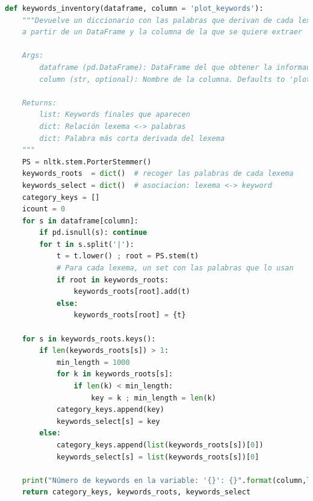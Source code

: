 \begin{lstlisting}[language=Python, caption= Obtención del lexema de cada keywords y creación del diccionario de equivalencia.]
def keywords_inventory(dataframe, column = 'plot_keywords'):
    """Devuelve un diccionario con las palabras que derivan de cada lexema
    a partir de un DataFrame y la columna de la que se quiere extraer
    
    Args:
        dataframe (pd.DataFrame): DataFrame del que obtener la información.
        column (str, optional): Nombre de la columna. Defaults to 'plot_keywords'.
    
    Returns:
        list: Keywords finales que aparecen
        dict: Relación lexema <-> palabras
        dict: Palabra más corta derivada del lexema
    """
    PS = nltk.stem.PorterStemmer()
    keywords_roots  = dict()  # recoger las palabras de cada lexema
    keywords_select = dict()  # asociacion: lexema <-> keyword
    category_keys = []
    icount = 0
    for s in dataframe[column]:
        if pd.isnull(s): continue
        for t in s.split('|'):
            t = t.lower() ; root = PS.stem(t)
            # Para cada lexema, un set con las palabras que lo usan
            if root in keywords_roots:                
                keywords_roots[root].add(t)
            else:
                keywords_roots[root] = {t}
    
    for s in keywords_roots.keys():
        if len(keywords_roots[s]) > 1:  
            min_length = 1000
            for k in keywords_roots[s]:
                if len(k) < min_length:
                    key = k ; min_length = len(k)            
            category_keys.append(key)
            keywords_select[s] = key
        else:
            category_keys.append(list(keywords_roots[s])[0])
            keywords_select[s] = list(keywords_roots[s])[0]
                   
    print("Número de keywords en la variable: '{}': {}".format(column,len(category_keys)))
    return category_keys, keywords_roots, keywords_select
\end{lstlisting}

